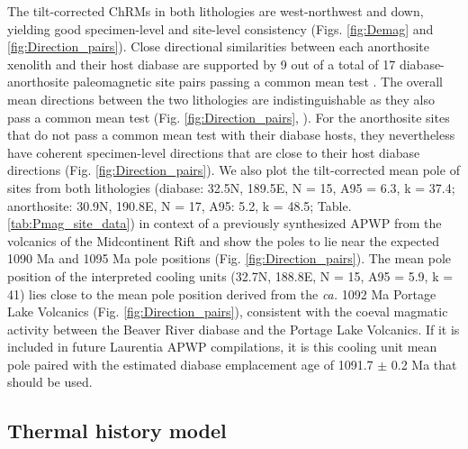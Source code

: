 \documentclass[draft]{agujournal2019}
\begin{document}
The tilt-corrected ChRMs in both lithologies are west-northwest and down, yielding good specimen-level and site-level consistency (Figs. \ref{fig:Demag} and \ref{fig:Direction_pairs}). Close directional similarities between each anorthosite xenolith and their host diabase are supported by 9 out of a total of 17 diabase-anorthosite paleomagnetic site pairs passing a common mean test \cite{McFadden1990a}. The overall mean directions between the two lithologies are indistinguishable as they also pass a common mean test (Fig. \ref{fig:Direction_pairs}, ). For the anorthosite sites that do not pass a common mean test with their diabase hosts, they nevertheless have coherent specimen-level directions that are close to their host diabase directions (Fig. \ref{fig:Direction_pairs}). We also plot the tilt-corrected mean pole of sites from both lithologies (diabase: 32.5\textdegree N, 189.5\textdegree E, N = 15, A95 = 6.3, k = 37.4; anorthosite: 30.9\textdegree N, 190.8\textdegree E, N = 17, A95: 5.2, k = 48.5; Table. \ref{tab:Pmag_site_data}) in context of a previously synthesized APWP from the volcanics of the Midcontinent Rift \cite{Swanson-Hysell2019a} and show the poles to lie near the expected 1090 Ma and 1095 Ma pole positions (Fig. \ref{fig:Direction_pairs}). The mean pole position of the interpreted cooling units (32.7\textdegree N, 188.8\textdegree E, N = 15, A95 = 5.9, k = 41) lies close to the mean pole position derived from the \textit{ca.} 1092 Ma Portage Lake Volcanics (Fig. \ref{fig:Direction_pairs}), consistent with the coeval magmatic activity between the Beaver River diabase and the Portage Lake Volcanics. If it is included in future Laurentia APWP compilations, it is this cooling unit mean pole paired with the estimated diabase emplacement age of 1091.7 $\pm$ 0.2 Ma that should be used.

\subsection{Thermal history model}
\end{document}
